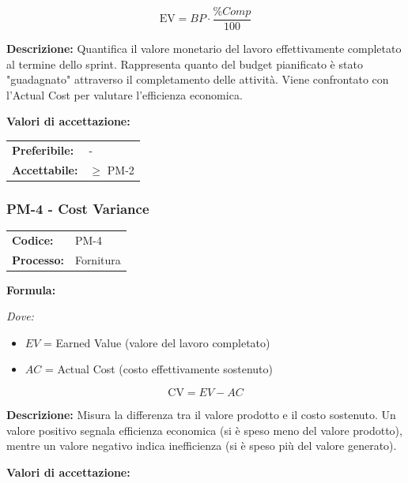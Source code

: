 \documentclass[a4paper,11pt,oneside]{scrartcl}
\begin{document}
\[
\text{EV} = BP \cdot \frac{\%Comp}{100}
\]

\noindent\textbf{Descrizione:} Quantifica il valore monetario del lavoro effettivamente completato al termine dello sprint. Rappresenta quanto del budget pianificato è stato "guadagnato" attraverso il completamento delle attività. Viene confrontato con l'Actual Cost per valutare l'efficienza economica.

\vspace{0.2cm}
\noindent\textbf{Valori di accettazione:}
\vspace{0.1cm}

\noindent
\begin{tabular}{@{}ll@{}}
\textbf{Preferibile:} & - \\
\textbf{Accettabile:} & $\geq$ PM-2 \\
\end{tabular}

\subsubsection{PM-4 - Cost Variance}

\noindent
\begin{tabular}{@{}p{}p{}@{}}
\textbf{Codice:} & PM-4 \\
\textbf{Processo:} & Fornitura \\
\end{tabular}

\vspace{0.3cm}
\noindent\textbf{Formula:}

\noindent\textit{Dove:}
\begin{itemize}[leftmargin=1.5cm, topsep=0pt, itemsep=0pt]
    \item $EV$ = Earned Value (valore del lavoro completato)
    \item $AC$ = Actual Cost (costo effettivamente sostenuto)
\end{itemize}

\[
\text{CV} = EV - AC
\]

\noindent\textbf{Descrizione:} Misura la differenza tra il valore prodotto e il costo sostenuto. Un valore positivo segnala efficienza economica (si è speso meno del valore prodotto), mentre un valore negativo indica inefficienza (si è speso più del valore generato).

\vspace{0.2cm}
\noindent\textbf{Valori di accettazione:}
\vspace{0.1cm}
\end{document}
